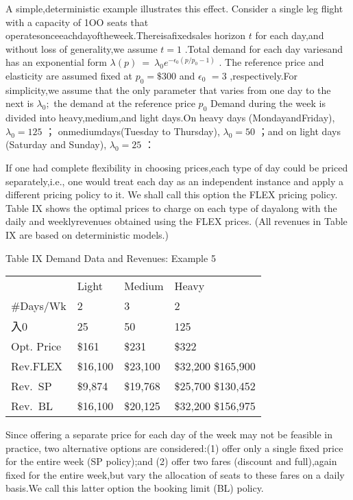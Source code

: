 A simple,deterministic example illustrates this effect. Consider a
single leg flight with a capacity of 1OO seats that
operatesonceeachdayoftheweek.Thereisafixedsales horizon \(t\) for each
day,and without loss of generality,we assume \(t = 1\) .Total demand for
each day variesand has an exponential form
\(\lambda ( p ) ~ = ~ \lambda _ { 0 } e ^ { - \epsilon _ { 0 } ( p / p _ { 0 } - 1 ) }\)
. The reference price and elasticity are assumed fixed at
\(p _ { 0 } = \$ 300\) and \(\epsilon _ { 0 }\) \(= 3\)
,respectively.For simplicity,we assume that the only parameter that
varies from one day to the next is \(\lambda _ { 0 } ;\) the demand at
the reference price \(p _ { 0 }\) Demand during the week is divided into
heavy,medium,and light days.On heavy days (MondayandFriday),
\(\lambda _ { 0 } = 1 2 5\) ； onmediumdays(Tuesday to Thursday),
\(\lambda _ { 0 } = 5 0\) ；and on light days (Saturday and Sunday),
\(\lambda _ { 0 } = 2 5\) ：

If one had complete flexibility in choosing prices,each type of day
could be priced separately,i.e., one would treat each day as an
independent instance and apply a different pricing policy to it. We
shall call this option the FLEX pricing policy. Table IX shows the
optimal prices to charge on each type of dayalong with the daily and
weeklyrevenues obtained using the FLEX prices. (All revenues in Table IX
are based on deterministic models.)

Table IX Demand Data and Revenues: Example 5

\begin{longtable}[]{@{}|l|l|l|l|@{}}
\toprule\noalign{}
\endhead
\bottomrule\noalign{}
\endlastfoot
\hline
\multicolumn{4}{@{}l@{}}{%
} \\
\hline
& Light & Medium & Heavy \\
\hline
\#Days/Wk & 2 & 3 & 2 \\
\hline
入0 & 25 & 50 & 125 \\
\hline
Opt. Price & \$161 & \$231 & \$322 \\
\hline
Rev.FLEX & \$16,100 & \$23,100 & \$32,200 \$165,900 \\
\hline
Rev.~SP & \$9,874 & \$19,768 & \$25,700 \$130,452 \\
\hline
Rev.~BL & \$16,100 & \$20,125 & \$32,200 \$156,975 \\
\hline
\end{longtable}

Since offering a separate price for each day of the week may not be
feasible in practice, two alternative options are considered:(1) offer
only a single fixed price for the entire week (SP policy);and (2) offer
two fares (discount and full),again fixed for the entire week,but vary
the allocation of seats to these fares on a daily basis.We call this
latter option the booking limit (BL) policy.

